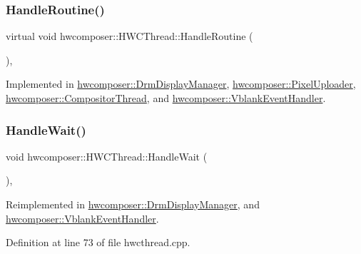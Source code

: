 \subsubsection{\texorpdfstring{Handle\+Routine()}{HandleRoutine()}}
{\footnotesize\ttfamily virtual void hwcomposer\+::\+H\+W\+C\+Thread\+::\+Handle\+Routine (\begin{DoxyParamCaption}{ }\end{DoxyParamCaption})\hspace{0.3cm}{\ttfamily [protected]}, {}}



Implemented in \mbox{\hyperlink{classhwcomposer_1_1DrmDisplayManager_a3f29044c35ff76edb4718ed19f340794}{hwcomposer\+::\+Drm\+Display\+Manager}}, \mbox{\hyperlink{classhwcomposer_1_1PixelUploader_a73abd205b50c5cdcc693886536553889}{hwcomposer\+::\+Pixel\+Uploader}}, \mbox{\hyperlink{classhwcomposer_1_1CompositorThread_af80e4eb7864b2f83a1eaa266a17b3a28}{hwcomposer\+::\+Compositor\+Thread}}, and \mbox{\hyperlink{classhwcomposer_1_1VblankEventHandler_a229ed2c06dc41d88000fdebcc3dd81f9}{hwcomposer\+::\+Vblank\+Event\+Handler}}.

\mbox{\label{classhwcomposer_1_1HWCThread_ab5acded48bbd1bf4d7c3a54dadb91ef9}} 
\subsubsection{\texorpdfstring{Handle\+Wait()}{HandleWait()}}
{\footnotesize\ttfamily void hwcomposer\+::\+H\+W\+C\+Thread\+::\+Handle\+Wait (\begin{DoxyParamCaption}{ }\end{DoxyParamCaption})\hspace{0.3cm}{\ttfamily [protected]}, {\ttfamily [virtual]}}



Reimplemented in \mbox{\hyperlink{classhwcomposer_1_1DrmDisplayManager_abcf8a2a9394d722a58b79060f9f51dbc}{hwcomposer\+::\+Drm\+Display\+Manager}}, and \mbox{\hyperlink{classhwcomposer_1_1VblankEventHandler_a567c783bd9baa74b99fdf4ae98fe25b1}{hwcomposer\+::\+Vblank\+Event\+Handler}}.



Definition at line 73 of file hwcthread.\+cpp.


